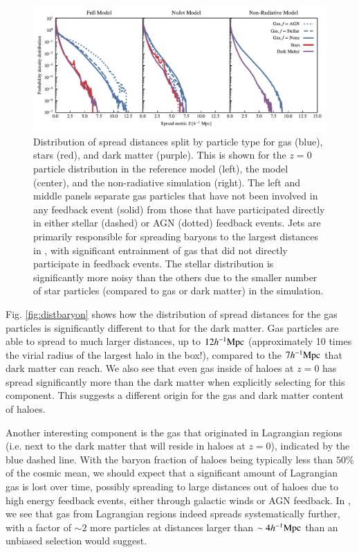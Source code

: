 \begin{figure}
    \centering
    \includegraphics[width=\textwidth]{figures/neighbour_analysis_feedback_histogram_combined.pdf}
    \vspace{-0.7cm}
    \caption{Distribution of spread distances split by particle type for gas
    (blue), stars (red), and dark matter (purple). This is shown for the
    $z=0$ particle distribution in the reference model (left), the \nojet{}
    model (center), and the non-radiative simulation (right). The left and
    middle panels separate gas particles that have not been involved in any
    feedback event (solid) from those that have participated directly in
    either stellar (dashed) or AGN (dotted) feedback events. Jets are
    primarily responsible for spreading baryons to the largest distances in
    \simba{}, with significant entrainment of gas that did not directly
    participate in feedback events. The stellar distribution is significantly
    more noisy than the others due to the smaller number of star particles
    (compared to gas or dark matter) in the simulation.
    }\label{fig:feedbackdistance}
\end{figure}


Fig. \ref{fig:distbaryon} shows how the distribution of spread distances
for the gas particles is significantly different to that for the dark matter.
Gas particles are able to spread to much larger distances, up to $12h^{-1}{\rm Mpc}{}$
(approximately 10 times the virial radius of the largest halo in the box!),
compared to the $7h^{-1}{\rm Mpc}{}$ that dark matter can reach. We also see that even
gas inside of haloes at $z=0$ has spread significantly more than the dark
matter when explicitly selecting for this component. This suggests a
different origin for the gas and dark matter content of haloes.

Another interesting component is the gas that originated in Lagrangian
regions (i.e. next to the dark matter that will reside in haloes at $z=0$),
indicated by the blue dashed line. With the baryon fraction of haloes being
typically less than $50\%$ of the cosmic mean, we should expect that a
significant amount of Lagrangian gas is lost over time, possibly spreading to
large distances out of haloes due to high energy feedback events, either
through galactic winds or AGN feedback. In \simba{}, we see that gas from
Lagrangian regions indeed spreads systematically further, with a factor of
$\sim 2$ more particles at distances larger than $\sim 4 h^{-1}{\rm Mpc}{}$ than an
unbiased selection would suggest.


